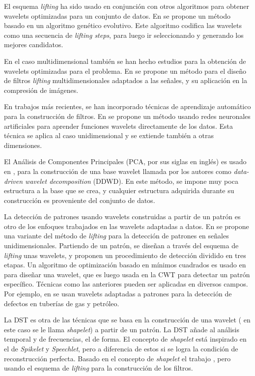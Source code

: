 El esquema \textit{lifting} ha sido usado en conjunción con otros algoritmos para obtener wavelets 
optimizadas para un conjunto de datos.
En \cite{Grasemann2004} se propone un método basado en un algoritmo genético evolutivo. Este algoritmo codifica las wavelets
como una secuencia de \textit{lifting steps}, para luego ir seleccionando y generando los mejores 
candidatos.

En el caso multidimensional también se han hecho estudios para la obtención de wavelets optimizadas para el problema.
En \cite{Gouze2004} se propone un método para el diseño de filtros \textit{lifting} multidimensionales adaptados a las señales, y  
su aplicación en la compresión de imágenes.

En trabajos más recientes, se han incorporado técnicas de aprendizaje automático para la construcción de filtros.
En \cite{Recoskie2018} se propone un método usando redes neuronales artificiales para aprender funciones 
wavelets directamente de los datos. Esta técnica se aplica al caso unidimensional y se extiende también a otras 
dimensiones.

El Análisis de Componentes Principales (PCA, por sus siglas en inglés) es usado en \cite{floryan}, para la construcción de una base wavelet llamada por los autores como \textit{data-driven wavelet decomposition}
(DDWD). En este método, se impone muy poca estructura a la base que se crea, y cualquier estructura adquirida durante su construcción
es proveniente del conjunto de datos.

La detección de patrones usando wavelets construidas a partir de un patrón es otro de los enfoques trabajados en las wavelets adaptadas a datos.  
En \cite{Mesa2005AdaptedWF} se propone una variante del método de \textit{lifting} para la detección de patrones en señales unidimensionales.
Partiendo de un patrón, se diseñan a través del esquema de \textit{ lifting } unas wavelets, y proponen un procedimiento
de detección dividido en tres etapas. Un algoritmo de optimización basado en mínimos cuadrados es usado en \cite{rpeak}
para diseñar una wavelet, que es luego usada en la CWT para detectar un patrón específico. 
Técnicas como las  anteriores pueden ser aplicadas en diversos campos. Por ejemplo, en \cite{Layouni2017} 
se usan wavelets adaptadas a 
patrones para la detección de defectos en tuberías de gas y petróleo.

La DST \cite{Guido2008} es otra de las técnicas que se basa en la construcción de una wavelet ( en este caso se le llama \textit{shapelet})
a partir de un patrón. La DST añade al análisis temporal y de frecuencias, el de forma. El concepto de \textit{shapelet}
está inspirado en el de \textit{Spikelet} y \textit{Speechlet}, pero a diferencia de estos si se logra  la condición
de reconstrucción perfecta. Basado en el concepto de \textit{shapelet} el trabajo \cite{lifting-shapelet}, pero usando
el esquema de \textit{lifting} para la construcción de los filtros. 


